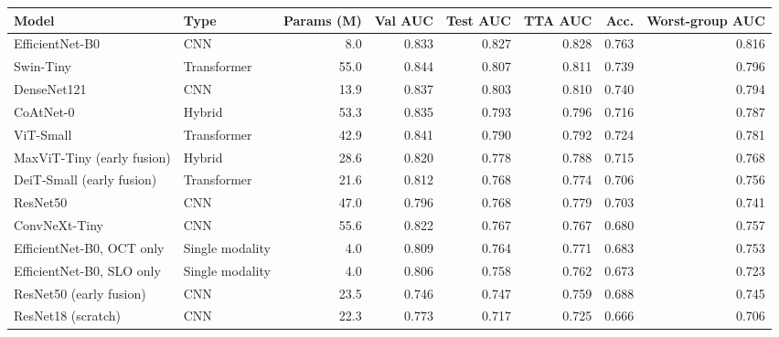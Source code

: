 \begin{tabular}{llrrrrrr}
\toprule
Model & Type & Params (M) & Val AUC & Test AUC & TTA AUC & Acc. & Worst-group AUC \\
\midrule
EfficientNet-B0 & CNN & 8.0 & 0.833 & 0.827 & 0.828 & 0.763 & 0.816 \\
Swin-Tiny & Transformer & 55.0 & 0.844 & 0.807 & 0.811 & 0.739 & 0.796 \\
DenseNet121 & CNN & 13.9 & 0.837 & 0.803 & 0.810 & 0.740 & 0.794 \\
CoAtNet-0 & Hybrid & 53.3 & 0.835 & 0.793 & 0.796 & 0.716 & 0.787 \\
ViT-Small & Transformer & 42.9 & 0.841 & 0.790 & 0.792 & 0.724 & 0.781 \\
MaxViT-Tiny (early fusion) & Hybrid & 28.6 & 0.820 & 0.778 & 0.788 & 0.715 & 0.768 \\
DeiT-Small (early fusion) & Transformer & 21.6 & 0.812 & 0.768 & 0.774 & 0.706 & 0.756 \\
ResNet50 & CNN & 47.0 & 0.796 & 0.768 & 0.779 & 0.703 & 0.741 \\
ConvNeXt-Tiny & CNN & 55.6 & 0.822 & 0.767 & 0.767 & 0.680 & 0.757 \\
EfficientNet-B0, OCT only & Single modality & 4.0 & 0.809 & 0.764 & 0.771 & 0.683 & 0.753 \\
EfficientNet-B0, SLO only & Single modality & 4.0 & 0.806 & 0.758 & 0.762 & 0.673 & 0.723 \\
ResNet50 (early fusion) & CNN & 23.5 & 0.746 & 0.747 & 0.759 & 0.688 & 0.745 \\
ResNet18 (scratch) & CNN & 22.3 & 0.773 & 0.717 & 0.725 & 0.666 & 0.706 \\
\bottomrule
\end{tabular}
